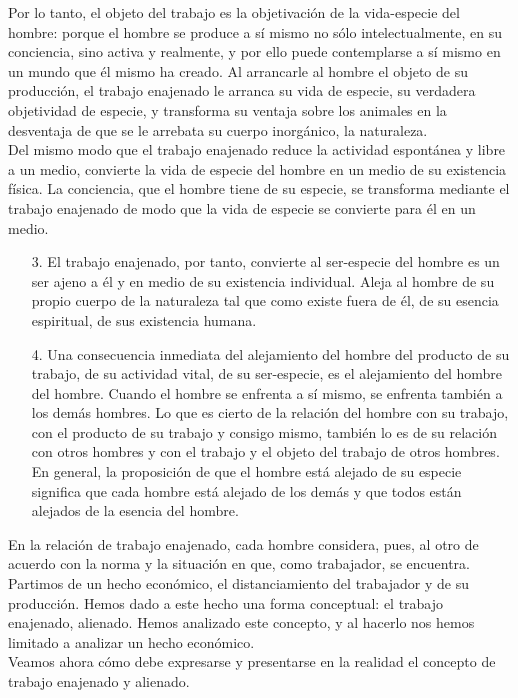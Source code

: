 Por lo tanto, el objeto del trabajo es la objetivación de la vida-especie del hombre: porque el hombre se produce a sí mismo no sólo intelectualmente, en su conciencia, sino activa y realmente, y por ello puede contemplarse a sí mismo en un mundo que él mismo ha creado.  Al arrancarle al hombre el objeto de su producción, el trabajo enajenado le arranca su vida de especie, su verdadera objetividad de especie, y transforma su ventaja sobre los animales en la desventaja de que se le arrebata su cuerpo inorgánico, la naturaleza. \\

Del mismo modo que el trabajo enajenado reduce la actividad espontánea y libre a un medio, convierte la vida de especie del hombre en un medio de su existencia física. La conciencia, que el hombre tiene de su especie, se transforma mediante el trabajo enajenado de modo que la vida de especie se convierte para él en un medio.

\begin{enumerate}[1.]
    \item[3.] El trabajo enajenado, por tanto, convierte al ser-especie del hombre es un ser ajeno a él y en medio de su existencia individual. Aleja al hombre de su propio cuerpo de la naturaleza tal que como existe fuera de él, de su esencia espiritual, de sus existencia humana.
    \item[4.] Una consecuencia inmediata del alejamiento del hombre del producto de su trabajo, de su actividad vital, de su ser-especie, es el alejamiento del hombre del hombre. Cuando el hombre se enfrenta a sí mismo, se enfrenta también a los demás hombres. Lo que es cierto de la relación del hombre con su trabajo, con el producto de su trabajo y consigo mismo, también lo es de su relación con otros hombres y con el trabajo y el objeto del trabajo de otros hombres. En general, la proposición de que el hombre está alejado de su especie significa que cada hombre está alejado de los demás y que todos están alejados de la esencia del hombre.\\
\end{enumerate}

En la relación de trabajo enajenado, cada hombre considera, pues, al otro de acuerdo con la norma y la situación en que, como trabajador, se encuentra.\\

Partimos de un hecho económico, el distanciamiento del trabajador y de su producción. Hemos dado a este hecho una forma conceptual: el trabajo enajenado, alienado. Hemos analizado este concepto, y al hacerlo nos hemos limitado a analizar un hecho económico.\\
Veamos ahora cómo debe expresarse y presentarse en la realidad el concepto de trabajo enajenado y alienado.\\

